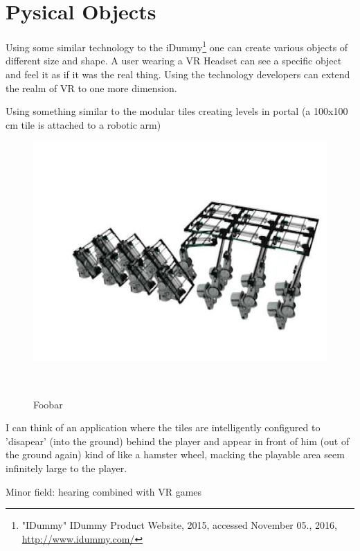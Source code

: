 \section{Pysical Objects}

Using some similar technology to the iDummy\footnote{"IDummy" IDummy Product Website, 2015, accessed November 05., 2016, \url{http://www.idummy.com/}} one can create various objects of different size and shape. A user wearing a VR Headset can see a specific object and feel it as if it was the real thing. Using the technology developers can extend the realm of VR to one more dimension.

Using something similar to the modular tiles creating levels in portal (a 100x100 cm tile is attached to a robotic arm)

\begin{figure}
	\centering
	\includegraphics[width=0.9\columnwidth]{./figures/hqdefault}
	\caption{Foobar}~\label{fig:figure2}
\end{figure}

I can think of an application where the tiles are intelligently configured to 'disapear' (into the ground) behind the player and appear in front of him (out of the ground again) kind of like a hamster wheel, macking the playable area seem infinitely large to the player.

Minor field: hearing combined with VR games
